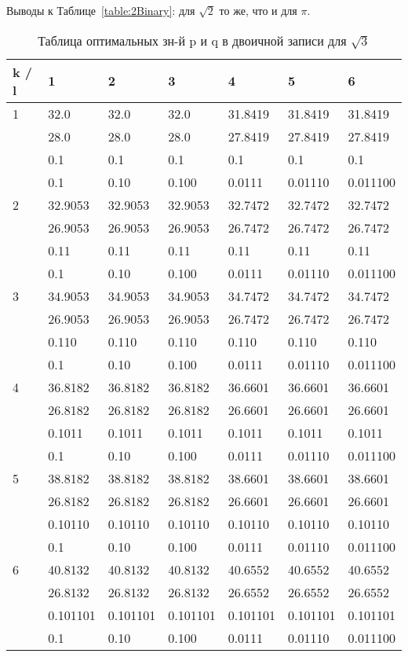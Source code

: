 \documentclass[12pt]{article}
\begin{document}
	Выводы к Таблице~\ref{table:2Binary}: для $\sqrt{2}$ то же, что и для $\pi$.
	
	\begin{table}[h]
		\caption{Таблица оптимальных зн-й p и q в двоичной записи для $\sqrt{3}$}
		\label{table:3Binary}
		\begin{center}
			\begin{tabular}{|l|l|l|l|l|l|l|}
				\hline
				k / l &1 & 2 & 3 & 4 & 5 & 6\\
				\hline
				1 & 32.0& 32.0& 32.0& 31.8419& 31.8419& 31.8419\\
				& 28.0& 28.0& 28.0& 27.8419& 27.8419& 27.8419\\
				& 0.1& 0.1& 0.1& 0.1& 0.1& 0.1\\
				& 0.1& 0.10& 0.100& 0.0111& 0.01110& 0.011100\\
				\hline
				2 & 32.9053& 32.9053& 32.9053& 32.7472& 32.7472& 32.7472\\
				& 26.9053& 26.9053& 26.9053& 26.7472& 26.7472& 26.7472\\
				& 0.11& 0.11& 0.11& 0.11& 0.11& 0.11\\
				& 0.1& 0.10& 0.100& 0.0111& 0.01110& 0.011100\\
				\hline
				3 & 34.9053& 34.9053& 34.9053& 34.7472& 34.7472& 34.7472\\
				& 26.9053& 26.9053& 26.9053& 26.7472& 26.7472& 26.7472\\
				& 0.110& 0.110& 0.110& 0.110& 0.110& 0.110\\
				& 0.1& 0.10& 0.100& 0.0111& 0.01110& 0.011100\\
				\hline
				4 & 36.8182& 36.8182& 36.8182& 36.6601& 36.6601& 36.6601\\
				& 26.8182& 26.8182& 26.8182& 26.6601& 26.6601& 26.6601\\
				& 0.1011& 0.1011& 0.1011& 0.1011& 0.1011& 0.1011\\
				& 0.1& 0.10& 0.100& 0.0111& 0.01110& 0.011100\\
				\hline
				5 & 38.8182& 38.8182& 38.8182& 38.6601& 38.6601& 38.6601\\
				& 26.8182& 26.8182& 26.8182& 26.6601& 26.6601& 26.6601\\
				& 0.10110& 0.10110& 0.10110& 0.10110& 0.10110& 0.10110\\
				& 0.1& 0.10& 0.100& 0.0111& 0.01110& 0.011100\\
				\hline
				6 & 40.8132& 40.8132& 40.8132& 40.6552& 40.6552& 40.6552\\
				& 26.8132& 26.8132& 26.8132& 26.6552& 26.6552& 26.6552\\
				& 0.101101& 0.101101& 0.101101& 0.101101& 0.101101& 0.101101\\
				& 0.1& 0.10& 0.100& 0.0111& 0.01110& 0.011100\\
				\hline
			\end{tabular}
		\end{center}
	\end{table}
	
\end{document}
